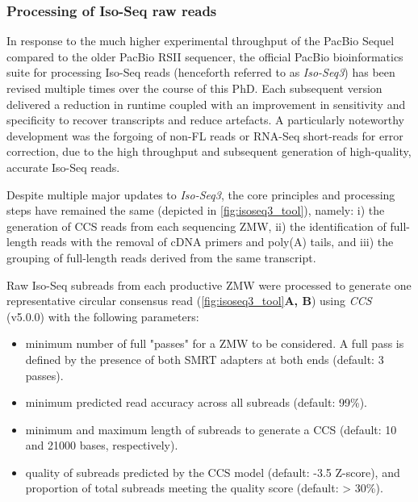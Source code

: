 \clearpage
\subsubsection{Processing of Iso-Seq raw reads}
\label{section: Isoseq_rawprocessing}
In response to the much higher experimental throughput of the PacBio Sequel compared to the older PacBio RSII sequencer, the official PacBio bioinformatics suite for processing Iso-Seq reads (henceforth referred to as \textit{Iso-Seq3}) has been revised multiple times over the course of this PhD. Each subsequent version delivered a reduction in runtime coupled with an improvement in sensitivity and specificity to recover transcripts and reduce artefacts. A particularly noteworthy development was the forgoing of non-FL reads or RNA-Seq short-reads for error correction, due to the high throughput and subsequent generation of high-quality, accurate Iso-Seq reads. 

Despite multiple major updates to \textit{Iso-Seq3}, the core principles and processing steps have remained the same (depicted in \cref{fig:isoseq3_tool}), namely: i) the generation of CCS reads from each sequencing ZMW, ii) the identification of full-length reads with the removal of cDNA primers and poly(A) tails, and iii) the grouping of full-length reads derived from the same transcript. 

Raw Iso-Seq subreads from each productive ZMW were processed to generate one representative circular consensus read (\cref{fig:isoseq3_tool}\textbf{A, B}) using \textit{CCS} (v5.0.0) with the following parameters: 
\begin{itemize}
	\item minimum number of full "passes" for a ZMW to be considered. A full pass is defined by the presence of both SMRT adapters at both ends (default: 3 passes).
	\item minimum predicted read accuracy across all subreads (default: 99\%).
	\item minimum and maximum length of subreads to generate a CCS (default: 10 and 21000 bases, respectively).
	\item quality of subreads predicted by the CCS model (default: -3.5 Z-score), and proportion of total subreads meeting the quality score (default: > 30\%).
\end{itemize}


